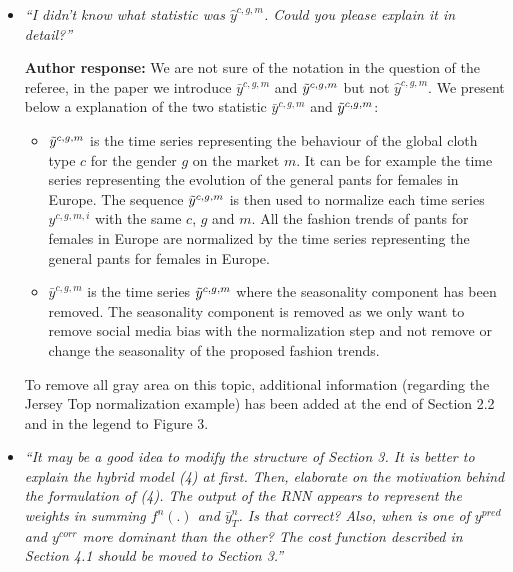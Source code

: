 \documentclass[10pt]{article} %
\begin{document}
\begin{itemize}
	\item {\em ``I didn't know what statistic was $\hat{y}^{c,g,m}$. Could you please explain it in detail?''} \medskip

	\textbf{Author response:} We are not sure of the notation in the question of the referee, in the paper we introduce $\bar{y}^{c,g,m}$ and $\Tilde{y}^{c,g,m}$ but not $\hat{y}^{c,g,m}$. We present below a explanation of the two statistic $\bar{y}^{c,g,m}$ and $\Tilde{y}^{c,g,m}$:
	\begin{itemize}
	\item $\Tilde{y}^{c,g,m}$ is the time series representing the behaviour of the global cloth type $c$ for the gender $g$ on the market $m$. It can be for example the time series representing the evolution of the general pants for females in Europe. The sequence $\Tilde{y}^{c,g,m}$ is then used to normalize each time series $y^{c,g,m,i}$ with the same $c$, $g$ and $m$. All the fashion trends of pants for females in Europe are normalized by the time series representing the general pants for females in Europe.
	\item $\bar{y}^{c,g,m}$ is the time series $\Tilde{y}^{c,g,m}$ where the seasonality component has been removed. The seasonality component is removed as we only want to remove social media bias with the normalization step and not remove or change the seasonality of the proposed fashion trends.
	\end{itemize}	
To remove all gray area on this topic, additional information (regarding the Jersey Top normalization example) has been added at the end of Section 2.2 and in the legend to Figure 3.

	\item {\em ``It may be a good idea to modify the structure of Section 3. It is better to explain the hybrid model (4) at first.  Then, elaborate on the motivation behind the formulation of (4). The output of the RNN appears to represent the weights in summing $f^n(.)$ and $\bar{y}^n_{T}$. Is that correct? Also, when is one of $y^{pred}$ and $y^{corr}$ more dominant than the other? The cost function described in Section 4.1 should be moved to Section 3.''} \medskip


\end{itemize}
\end{document}
